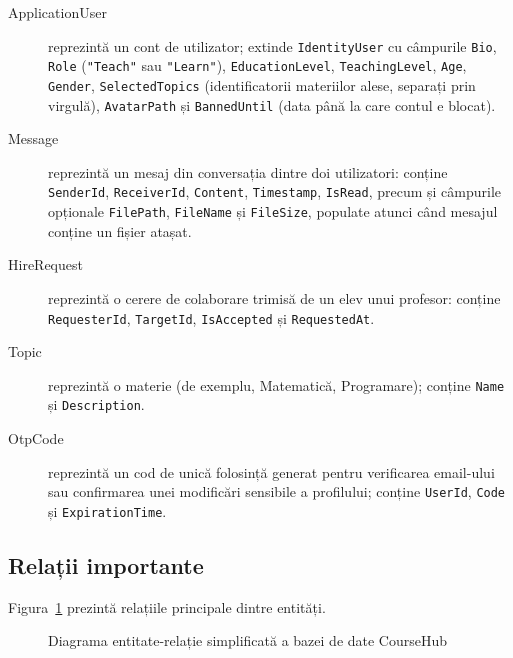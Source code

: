 \begin{description}
    \item[ApplicationUser] reprezintă un cont de utilizator; extinde \texttt{IdentityUser}
    cu câmpurile \texttt{Bio}, \texttt{Role} (\texttt{"Teach"} sau \texttt{"Learn"}),
    \texttt{EducationLevel}, \texttt{TeachingLevel}, \texttt{Age}, \texttt{Gender},
    \texttt{SelectedTopics} (identificatorii materiilor alese, separați prin virgulă),
    \texttt{AvatarPath} și \texttt{BannedUntil} (data până la care contul e blocat).
    \item[Message] reprezintă un mesaj din conversația dintre doi utilizatori: conține
    \texttt{SenderId}, \texttt{ReceiverId}, \texttt{Content}, \texttt{Timestamp},
    \texttt{IsRead}, precum și câmpurile opționale \texttt{FilePath}, \texttt{FileName}
    și \texttt{FileSize}, populate atunci când mesajul conține un fișier atașat.
    \item[HireRequest] reprezintă o cerere de colaborare trimisă de un elev unui profesor:
    conține \texttt{RequesterId}, \texttt{TargetId}, \texttt{IsAccepted} și
    \texttt{RequestedAt}.
    \item[Topic] reprezintă o materie (de exemplu, Matematică, Programare);
    conține \texttt{Name} și \texttt{Description}.
    \item[OtpCode] reprezintă un cod de unică folosință generat pentru verificarea
    email-ului sau confirmarea unei modificări sensibile a profilului; conține
    \texttt{UserId}, \texttt{Code} și \texttt{ExpirationTime}.
\end{description}

\subsection{Relații importante}

Figura~\ref{fig:er-diagram} prezintă relațiile principale dintre entități.

\begin{figure}[h]
\centering
{}
\caption{Diagrama entitate-relație simplificată a bazei de date CourseHub}
\label{fig:er-diagram}
\end{figure}

